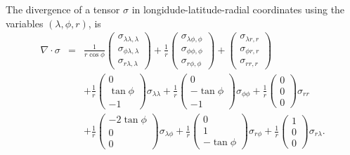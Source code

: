 \documentclass[11pt]{report}
\begin{document}
The divergence of a tensor $\sigma$ in longidude-latitude-radial coordinates using the variables $(\lambda, \phi, r)$, is 
\begin{eqnarray}
\nabla\cdot\sigma
&=& \frac{1}{r\cos\phi} \left( \begin{array}{c} \sigma_{\lambda\lambda,\lambda} \\ \sigma_{\phi\lambda,\lambda} \\ \sigma_{r\lambda,\lambda} \end{array} \right)
+ \frac{1}{r}       \left( \begin{array}{c} \sigma_{\lambda\phi,\phi} \\ \sigma_{\phi\phi,\phi} \\ \sigma_{r\phi,\phi} \end{array} \right)
+                   \left( \begin{array}{c} \sigma_{\lambda r,r} \\ \sigma_{\phi r,r} \\ \sigma_{rr,r} \end{array} \right) \nonumber
\\ && 
+ \frac{1}{r}       \left( \begin{array}{c} 0 \\ \tan\phi \\ -1 \end{array} \right) \sigma_{\lambda\lambda} 
+ \frac{1}{r}       \left( \begin{array}{c} 0 \\ -\tan\phi \\ -1 \end{array} \right) \sigma_{\phi\phi} 
+ \frac{1}{r}       \left( \begin{array}{c} 0 \\ 0 \\ 0 \end{array} \right) \sigma_{r r}   \nonumber
\\ &&
+ \frac{1}{r}       \left( \begin{array}{c} -2\tan\phi \\ 0 \\ 0 \end{array} \right) \sigma_{\lambda\phi} 
+ \frac{1}{r}       \left( \begin{array}{c} 0 \\ 1 \\ -\tan\phi \end{array} \right) \sigma_{r\phi} 
+ \frac{1}{r}       \left( \begin{array}{c} 1 \\ 0 \\ 0 \end{array} \right) \sigma_{r\lambda}.
\end{eqnarray}
\end{document}
